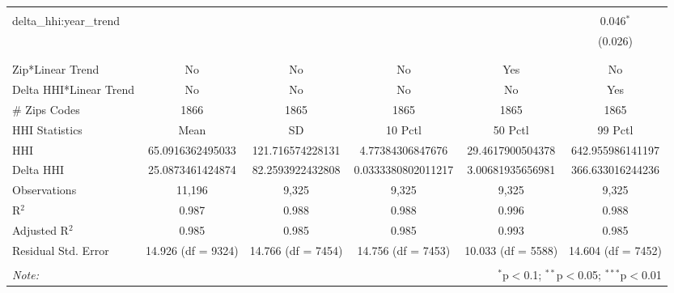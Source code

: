 \begin{table}[H]
{\begin{tabular}{@{\extracolsep{5pt}}lccccc}
   & & & & & \\  

  delta\_hhi:year\_trend &  &  &  &  & 0.046$^{*}$ \\  

   &  &  &  &  & (0.026) \\  

   & & & & & \\  

 \hline \\[-1.8ex]  

 Zip*Linear Trend & No & No & No & Yes & No \\  

 Delta HHI*Linear Trend & No & No & No & No & Yes \\  

 # Zips Codes & 1866 & 1865 & 1865 & 1865 & 1865 \\  

 HHI Statistics & Mean & SD & 10 Pctl & 50 Pctl & 99 Pctl \\  

 HHI & 65.0916362495033 & 121.716574228131 & 4.77384306847676 & 29.4617900504378 & 642.955986141197 \\  

 Delta HHI & 25.0873461424874 & 82.2593922432808 & 0.0333380802011217 & 3.00681935656981 & 366.633016244236 \\  

 Observations & 11,196 & 9,325 & 9,325 & 9,325 & 9,325 \\  

 R$^{2}$ & 0.987 & 0.988 & 0.988 & 0.996 & 0.988 \\  

 Adjusted R$^{2}$ & 0.985 & 0.985 & 0.985 & 0.993 & 0.985 \\  

 Residual Std. Error & 14.926 (df = 9324) & 14.766 (df = 7454) & 14.756 (df = 7453) & 10.033 (df = 5588) & 14.604 (df = 7452) \\  

 \hline  

 \hline \\[-1.8ex]  

 \textit{Note:}  & \multicolumn{5}{r}{$^{*}$p$<$0.1; $^{**}$p$<$0.05; $^{***}$p$<$0.01} \\  

 \end{tabular}}  

 \end{table}  

